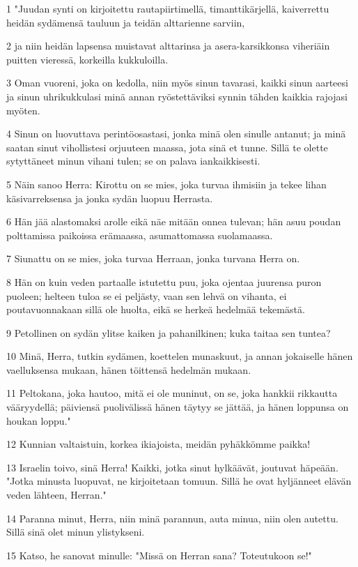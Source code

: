 \par 1 "Juudan synti on kirjoitettu rautapiirtimellä, timanttikärjellä, kaiverrettu heidän sydämensä tauluun ja teidän alttarienne sarviin,
\par 2 ja niin heidän lapsensa muistavat alttarinsa ja asera-karsikkonsa viheriäin puitten vieressä, korkeilla kukkuloilla.
\par 3 Oman vuoreni, joka on kedolla, niin myös sinun tavarasi, kaikki sinun aarteesi ja sinun uhrikukkulasi minä annan ryöstettäviksi synnin tähden kaikkia rajojasi myöten.
\par 4 Sinun on luovuttava perintöosastasi, jonka minä olen sinulle antanut; ja minä saatan sinut vihollistesi orjuuteen maassa, jota sinä et tunne. Sillä te olette sytyttäneet minun vihani tulen; se on palava iankaikkisesti.
\par 5 Näin sanoo Herra: Kirottu on se mies, joka turvaa ihmisiin ja tekee lihan käsivarreksensa ja jonka sydän luopuu Herrasta.
\par 6 Hän jää alastomaksi arolle eikä näe mitään onnea tulevan; hän asuu poudan polttamissa paikoissa erämaassa, asumattomassa suolamaassa.
\par 7 Siunattu on se mies, joka turvaa Herraan, jonka turvana Herra on.
\par 8 Hän on kuin veden partaalle istutettu puu, joka ojentaa juurensa puron puoleen; helteen tuloa se ei peljästy, vaan sen lehvä on vihanta, ei poutavuonnakaan sillä ole huolta, eikä se herkeä hedelmää tekemästä.
\par 9 Petollinen on sydän ylitse kaiken ja pahanilkinen; kuka taitaa sen tuntea?
\par 10 Minä, Herra, tutkin sydämen, koettelen munaskuut, ja annan jokaiselle hänen vaelluksensa mukaan, hänen töittensä hedelmän mukaan.
\par 11 Peltokana, joka hautoo, mitä ei ole muninut, on se, joka hankkii rikkautta vääryydellä; päiviensä puolivälissä hänen täytyy se jättää, ja hänen loppunsa on houkan loppu."
\par 12 Kunnian valtaistuin, korkea ikiajoista, meidän pyhäkkömme paikka!
\par 13 Israelin toivo, sinä Herra! Kaikki, jotka sinut hylkäävät, joutuvat häpeään. "Jotka minusta luopuvat, ne kirjoitetaan tomuun. Sillä he ovat hyljänneet elävän veden lähteen, Herran."
\par 14 Paranna minut, Herra, niin minä parannun, auta minua, niin olen autettu. Sillä sinä olet minun ylistykseni.
\par 15 Katso, he sanovat minulle: "Missä on Herran sana? Toteutukoon se!"
